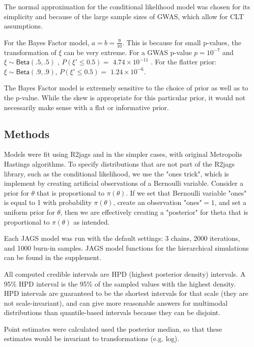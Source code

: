 \documentclass[AMA,STIX1COL]{WileyNJD-v2}\usepackage[]{graphicx}\usepackage[]{color}
\begin{document}
The normal approximation for the conditional likelihood model was chosen for its simplicity and because of the large sample sizes of GWAS, which allow for CLT assumptions.

For the Bayes Factor model, $a = b= \frac{9}{10}$. This is because for small p-values, the transformation of $\xi$ can be very extreme. For a GWAS p-value $p = 10^{-7}$ and $\xi \sim \textsf{Beta}(.5,.5)$ , $P( \xi' \leq 0.5) =$  $\ensuremath{4.74\times 10^{-11}}$ . For the flatter prior: $\xi \sim \textsf{Beta}(.9,.9)$, $P( \xi' \leq 0.5) =$ $\ensuremath{1.24\times 10^{-6}}$.

The Bayes Factor model is extremely sensitive to the choice of prior as well as to the p-value. While the skew is appropriate for this particular prior, it would not necessarily make sense with a flat or informative prior.

\subsection{Methods}

Models were fit using R2jags and in the simpler cases, with original Metropolis Hastings algorithms. To specify distributions that are not part of the R2jags library, such as the conditional likelihood, we use the "ones trick", which is implement by creating artificial observations of a Bernoulli variable. Consider a prior for $\theta$ that is proportional to $\pi(\theta)$. If we set that Bernoulli variable "ones" is equal to 1 with probability $\pi(\theta)$, create an observation "ones"$= 1$, and set a uniform prior for $\theta$, then we are effectively creating a "posterior" for theta that is proportional to  $\pi(\theta)$ as intended.

Each JAGS model was run with the default settings: 3 chains, 2000 iterations, and 1000 burn-in samples. JAGS model functions for the hierarchical simulations can be found in the supplement.

All computed credible intervals are HPD (highest posterior density) intervals. A 95\% HPD interval is the 95\% of the sampled values with the highest density. HPD intervals are guaranteed to be the shortest intervals for that scale (they are not scale-invariant), and can give more reasonable answers for multimodal distributions than quantile-based intervals because they can be disjoint.

Point estimates were calculated used the posterior median, so that these estimates would be invariant to transformations (e.g. log).
\end{document}
